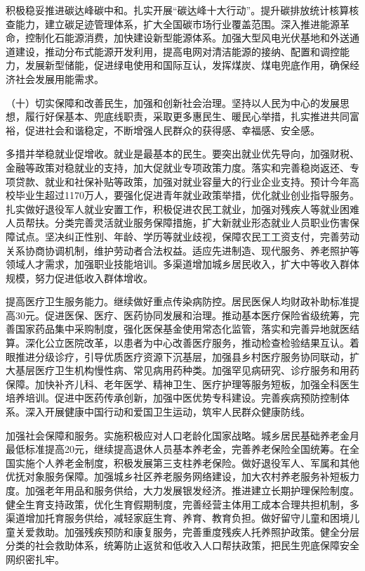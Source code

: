 \documentclass[10pt, UTF8]{ctexbook} %
\begin{document}
积极稳妥推进碳达峰碳中和。扎实开展“碳达峰十大行动”。提升碳排放统计核算核查能力，建立碳足迹管理体系，扩大全国碳市场行业覆盖范围。深入推进能源革命，控制化石能源消费，加快建设新型能源体系。加强大型风电光伏基地和外送通道建设，推动分布式能源开发利用，提高电网对清洁能源的接纳、配置和调控能力，发展新型储能，促进绿电使用和国际互认，发挥煤炭、煤电兜底作用，确保经济社会发展用能需求。

（十）切实保障和改善民生，加强和创新社会治理。坚持以人民为中心的发展思想，履行好保基本、兜底线职责，采取更多惠民生、暖民心举措，扎实推进共同富裕，促进社会和谐稳定，不断增强人民群众的获得感、幸福感、安全感。

多措并举稳就业促增收。就业是最基本的民生。要突出就业优先导向，加强财税、金融等政策对稳就业的支持，加大促就业专项政策力度。落实和完善稳岗返还、专项贷款、就业和社保补贴等政策，加强对就业容量大的行业企业支持。预计今年高校毕业生超过1170万人，要强化促进青年就业政策举措，优化就业创业指导服务。扎实做好退役军人就业安置工作，积极促进农民工就业，加强对残疾人等就业困难人员帮扶。分类完善灵活就业服务保障措施，扩大新就业形态就业人员职业伤害保障试点。坚决纠正性别、年龄、学历等就业歧视，保障农民工工资支付，完善劳动关系协商协调机制，维护劳动者合法权益。适应先进制造、现代服务、养老照护等领域人才需求，加强职业技能培训。多渠道增加城乡居民收入，扩大中等收入群体规模，努力促进低收入群体增收。

提高医疗卫生服务能力。继续做好重点传染病防控。居民医保人均财政补助标准提高30元。促进医保、医疗、医药协同发展和治理。推动基本医疗保险省级统筹，完善国家药品集中采购制度，强化医保基金使用常态化监管，落实和完善异地就医结算。深化公立医院改革，以患者为中心改善医疗服务，推动检查检验结果互认。着眼推进分级诊疗，引导优质医疗资源下沉基层，加强县乡村医疗服务协同联动，扩大基层医疗卫生机构慢性病、常见病用药种类。加强罕见病研究、诊疗服务和用药保障。加快补齐儿科、老年医学、精神卫生、医疗护理等服务短板，加强全科医生培养培训。促进中医药传承创新，加强中医优势专科建设。完善疾病预防控制体系。深入开展健康中国行动和爱国卫生运动，筑牢人民群众健康防线。

加强社会保障和服务。实施积极应对人口老龄化国家战略。城乡居民基础养老金月最低标准提高20元，继续提高退休人员基本养老金，完善养老保险全国统筹。在全国实施个人养老金制度，积极发展第三支柱养老保险。做好退役军人、军属和其他优抚对象服务保障。加强城乡社区养老服务网络建设，加大农村养老服务补短板力度。加强老年用品和服务供给，大力发展银发经济。推进建立长期护理保险制度。健全生育支持政策，优化生育假期制度，完善经营主体用工成本合理共担机制，多渠道增加托育服务供给，减轻家庭生育、养育、教育负担。做好留守儿童和困境儿童关爱救助。加强残疾预防和康复服务，完善重度残疾人托养照护政策。健全分层分类的社会救助体系，统筹防止返贫和低收入人口帮扶政策，把民生兜底保障安全网织密扎牢。
\end{document}
